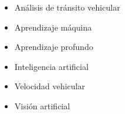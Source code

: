 
\begin{spacing}{1.5}

\begin{itemize}

    \item Análisis de tránsito vehicular
    \item Aprendizaje máquina
    \item Aprendizaje profundo
    \item Inteligencia artificial
    \item Velocidad vehicular
    \item Visión artificial

\end{itemize}

\end{spacing}